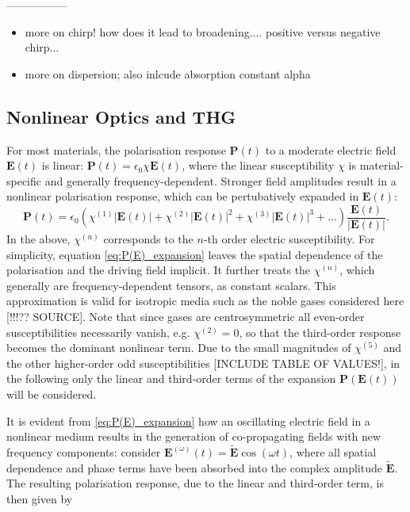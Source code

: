 \documentclass[a4paper]{jpconf}
\begin{document}
-----------------
\begin{itemize}
\item more on chirp! how does it lead to broadening.... positive versus negative chirp...
\item more on dispersion; also inlcude absorption constant alpha 
\end{itemize}

\subsection{Nonlinear Optics and THG}
For most materials, the polarisation response $\mathbf{P}(t)$ to a moderate electric field $\mathbf{E}(t)$ is linear: $\mathbf{P}(t) = \epsilon_0 \chi \mathbf{E}(t)$, where the linear susceptibility $\chi$ is material-specific and generally frequency-dependent. Stronger field amplitudes result in a nonlinear polarisation response, which can be pertubatively expanded in $\mathbf{E}(t)$:
\begin{equation}\label{eq:P(E)_expansion}
\mathbf{P}(t) = \epsilon_0 \left( \chi^{(1)}|\mathbf{E}(t)| + \chi^{(2)}|\mathbf{E}(t)|^2 +  \chi^{(3)}|\mathbf{E}(t)|^3 + ...  \right) \frac{\mathbf{E}(t)}{|\mathbf{E}(t)|}.
\end{equation}
In the above, $\chi^{(n)}$ corresponds to the $n$-th order electric susceptibility. For simplicity, equation \eqref{eq:P(E)_expansion} leaves the spatial dependence of the polarisation and the driving field implicit. It further treats the $\chi^{(n)}$, which generally are frequency-dependent tensors, as constant scalars. This approximation is valid for isotropic media such as the noble gases considered here [!!!?? SOURCE]. Note that since gases are centrosymmetric all even-order susceptibilities necessarily vanish, e.g. $\chi^{(2)}=0$, so that the third-order response becomes the dominant nonlinear term. Due to the small magnitudes of $\chi^{(5)}$ and the other higher-order odd susceptibilities [INCLUDE TABLE OF VALUES!], in the following only the linear and third-order terms of the expansion $\mathbf{P}(\mathbf{E}(t))$ will be considered. \par 
It is evident from \eqref{eq:P(E)_expansion} how an oscillating electric field in a nonlinear medium results in the generation of co-propagating fields with new frequency components: consider $\mathbf{E}^{(\omega)}(t) = \tilde{\mathbf{E}} \cos(\omega t)$, where all spatial dependence and phase terms have been absorbed into the complex amplitude  $\tilde{\mathbf{E}}$. The resulting polarisation response, due to the linear and third-order term, is then given by 
\end{document}
